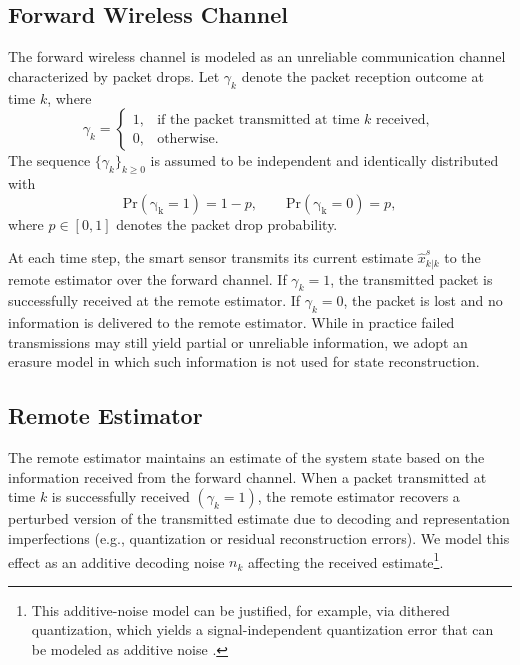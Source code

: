 \documentclass[letterpaper, 10 pt, conference]{ieeeconf}
\begin{document}
\subsection{Forward Wireless Channel}
\label{subsec:forward_channel}
The forward wireless channel is modeled as an unreliable communication channel characterized  by packet drops. Let $\gamma_k$ denote the packet reception outcome at time $k$, where
\begin{equation*}
    \gamma_k =
\begin{cases}
1, & \text{if the packet transmitted at time $k$ received},\\[3pt]
0, & \text{otherwise}.
\end{cases}
\end{equation*}
The sequence $\{\gamma_k\}_{k\geq 0}$ is assumed to be independent and identically distributed with
\begin{equation}\label{FWC.eq}
\operatorname{Pr(\gamma_k=1)} = 1-p,\qquad
\operatorname{Pr(\gamma_k=0)} = p, 
\end{equation}
 where $p\in [0,1]$ denotes the packet drop probability. 

At each time step, the smart sensor transmits its current estimate $\hat{x}^s_{k|k}$ to the remote estimator over the forward channel. If $\gamma_k=1$, the transmitted packet is successfully received at the remote estimator. If $\gamma_k=0$, the packet is lost and no information is delivered to the remote estimator. While in practice failed transmissions may still yield partial or unreliable information, we adopt an erasure model in which such information is not used for state reconstruction.






\subsection{Remote Estimator}
\label{subsec:remote_estimator}
The remote estimator maintains an estimate of the system state based on the information received from the forward channel. 
When a packet transmitted at time $k$ is successfully received $(\gamma_k=1)$, the remote estimator recovers a perturbed version of the transmitted estimate due to decoding and representation imperfections (e.g., quantization or residual reconstruction errors). We model this effect as an  additive decoding noise $n_k$ affecting the received estimate\footnote{This additive-noise model can be justified, for example, via dithered quantization, which yields a signal-independent quantization error that can be modeled as additive noise \cite{zamir1996information}.}. 
\end{document}
